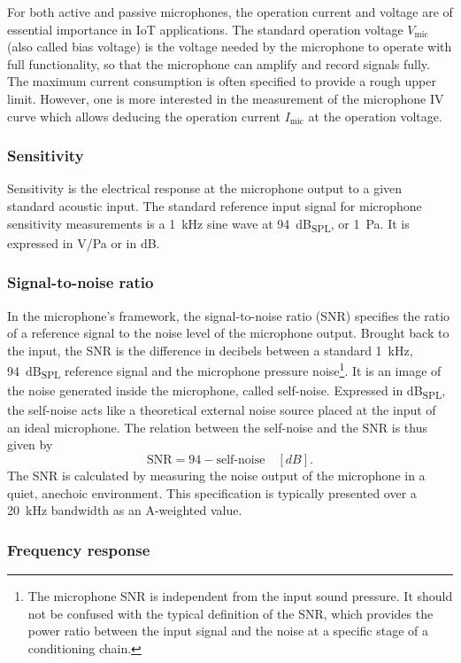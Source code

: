 \documentclass{EPL-master-thesis-covers-EN}
\newcommand{\te}[1]{\textrm{#1}}
\begin{document}
For both active and passive microphones, the operation current and voltage are of essential importance in IoT applications. The standard operation voltage $V_{\te{mic}}$ (also called bias voltage) is the voltage needed by the microphone to operate with full functionality, so that the microphone can amplify and record signals fully. The maximum current consumption is often specified to provide a rough upper limit. However, one is more interested in the measurement of the microphone IV curve which allows deducing the operation current $I_{\te{mic}}$ at the operation voltage.

\subsubsection*{Sensitivity}

Sensitivity is the electrical response at the microphone output to a given standard acoustic input. The standard reference input signal for microphone sensitivity measurements is a \SI{1}{kHz} sine wave at \SI{94}{dB_{SPL}}, or \SI{1}{Pa}. It is expressed in \si{V/Pa} or in \si{dB}.

\subsubsection*{Signal-to-noise ratio}

In the microphone's framework, the signal-to-noise ratio (SNR) specifies the ratio of a reference signal to the noise level of the microphone output. Brought back to the input, the SNR is the difference in decibels between a standard \SI{1}{kHz}, \SI{94}{dB_{SPL}} reference signal and the microphone pressure noise\footnote{The microphone SNR is independent from the input sound pressure. It should not be confused with the typical definition of the SNR, which provides the power ratio between the input signal and the noise at a specific stage of a conditioning chain.}. It is an image of the noise generated inside the microphone, called self-noise. Expressed in \si{dB_{SPL}}, the self-noise acts like a theoretical external noise source placed at the input of an ideal microphone. The relation between the self-noise and the SNR is thus given by
\[
 \te{SNR} = 94 - \te{self-noise} \quad \si{[dB]}.
\]
The SNR is calculated by measuring the noise output of the microphone in a quiet, anechoic environment. This specification is typically presented over a \SI{20}{kHz} bandwidth as an A-weighted value.

\subsubsection*{Frequency response}
\end{document}
